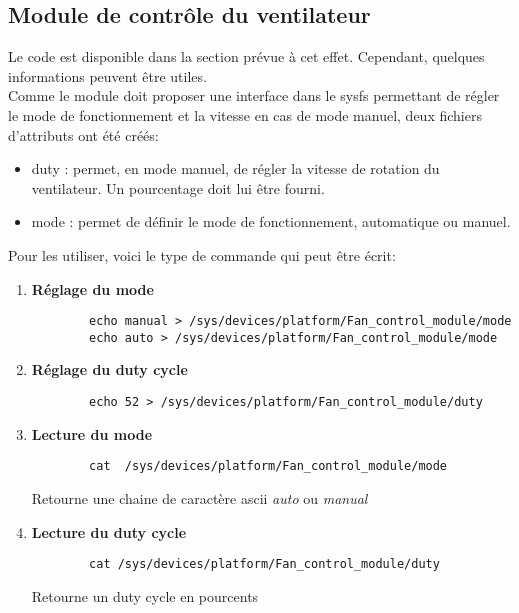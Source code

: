 \subsection{Module de contrôle du ventilateur}
Le code est disponible dans la section prévue à cet effet. Cependant, quelques informations peuvent être utiles. \\
Comme le module doit proposer une interface dans le sysfs permettant de régler le mode de fonctionnement et la vitesse en cas de mode manuel, deux fichiers d'attributs ont été créés:
\begin{itemize}
	\item duty : permet, en mode manuel, de régler la vitesse de rotation du ventilateur. Un pourcentage doit lui être fourni.
	\item mode : permet de définir le mode de fonctionnement, automatique ou manuel. 
\end{itemize}
Pour les utiliser, voici le type de commande qui peut être écrit:\\
\begin{enumerate}
	\item \textbf{Réglage du mode}\\
	\begin{lstlisting}
		echo manual > /sys/devices/platform/Fan_control_module/mode
		echo auto > /sys/devices/platform/Fan_control_module/mode
	\end{lstlisting}
	\item \textbf{Réglage du duty cycle}
	\begin{lstlisting}
		echo 52 > /sys/devices/platform/Fan_control_module/duty
	\end{lstlisting}
	\item \textbf{Lecture du mode}
	\begin{lstlisting}
		cat  /sys/devices/platform/Fan_control_module/mode
	\end{lstlisting}
	Retourne une chaine de caractère ascii \textit{auto} ou \textit{manual}
	\item \textbf{Lecture du duty cycle}
	\begin{lstlisting}
		cat /sys/devices/platform/Fan_control_module/duty 
	\end{lstlisting}
	Retourne un duty cycle en pourcents
\end{enumerate}